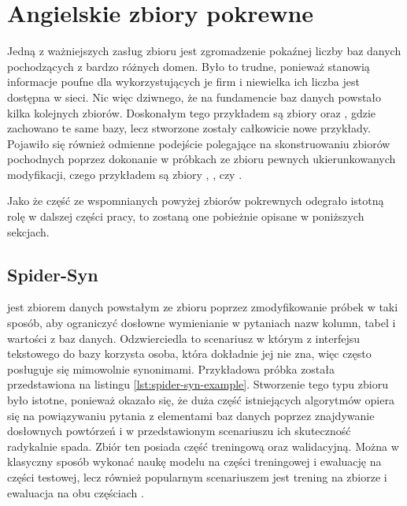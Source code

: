 \section{Angielskie zbiory pokrewne} \label{text:related-datasets}
Jedną z ważniejszych zasług zbioru  jest zgromadzenie pokaźnej liczby baz danych pochodzących z bardzo różnych domen. Było to trudne, ponieważ stanowią informacje poufne dla wykorzystujących je firm i niewielka ich liczba jest dostępna w sieci. Nic więc dziwnego, że na fundamencie baz danych  powstało kilka kolejnych zbiorów. Doskonałym tego przykładem są zbiory   oraz  , gdzie zachowano te same bazy, lecz stworzone zostały całkowicie nowe przykłady. Pojawiło się również odmienne podejście polegające na skonstruowaniu zbiorów pochodnych poprzez dokonanie w próbkach ze zbioru  pewnych ukierunkowanych modyfikacji, czego przykładem są zbiory  ,  , czy  .

Jako że część ze wspomnianych powyżej zbiorów pokrewnych  odegrało istotną rolę w dalszej części pracy, to zostaną one pobieżnie opisane w poniższych sekcjach.

\subsection{Spider-Syn}
  jest zbiorem danych powstałym ze zbioru  poprzez zmodyfikowanie próbek w taki sposób, aby ograniczyć dosłowne wymienianie w pytaniach nazw kolumn, tabel i wartości z baz danych. Odzwierciedla to scenariusz w którym z interfejsu tekstowego do bazy korzysta osoba, która dokładnie jej nie zna, więc często posługuje się mimowolnie synonimami. Przykładowa próbka została przedstawiona na listingu \ref{lst:spider-syn-example}. Stworzenie tego typu zbioru było istotne, ponieważ okazało się, że duża część istniejących algorytmów opiera się na powiązywaniu pytania z elementami baz danych poprzez znajdywanie dosłownych powtórzeń i w przedstawionym scenariuszu ich skuteczność radykalnie spada. Zbiór ten posiada część treningową oraz walidacyjną. Można w klasyczny sposób wykonać naukę modelu na części treningowej i ewaluację na części testowej, lecz również popularnym scenariuszem jest trening na zbiorze  i ewaluacja na obu częściach .

\begin{minipage}{\linewidth}

\end{minipage}

